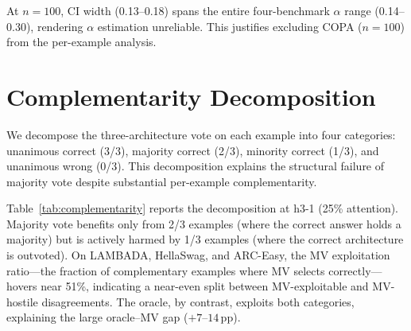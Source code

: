 \begin{table}[ht]
\centering
\small
\caption{$\alpha$ estimation stability: 95\% CI width by subsample size.}
\label{tab:subsample}
\par\vspace{1pt}
{\footnotesize At $n = 100$, CI width (0.13--0.18) spans the entire four-benchmark $\alpha$ range (0.14--0.30), rendering $\alpha$ estimation unreliable. This justifies excluding COPA ($n = 100$) from the per-example analysis.}
\end{table}

\section{Complementarity Decomposition}\label{app:complementarity}

We decompose the three-architecture vote on each example into four categories: unanimous correct (3/3), majority correct (2/3), minority correct (1/3), and unanimous wrong (0/3). This decomposition explains the structural failure of majority vote despite substantial per-example complementarity.

Table~\ref{tab:complementarity} reports the decomposition at h3-1 (25\% attention). Majority vote benefits only from 2/3 examples (where the correct answer holds a majority) but is actively harmed by 1/3 examples (where the correct architecture is outvoted). On LAMBADA, HellaSwag, and ARC-Easy, the MV exploitation ratio---the fraction of complementary examples where MV selects correctly---hovers near 51\%, indicating a near-even split between MV-exploitable and MV-hostile disagreements. The oracle, by contrast, exploits both categories, explaining the large oracle--MV gap ($+7$--$14$\,pp).

